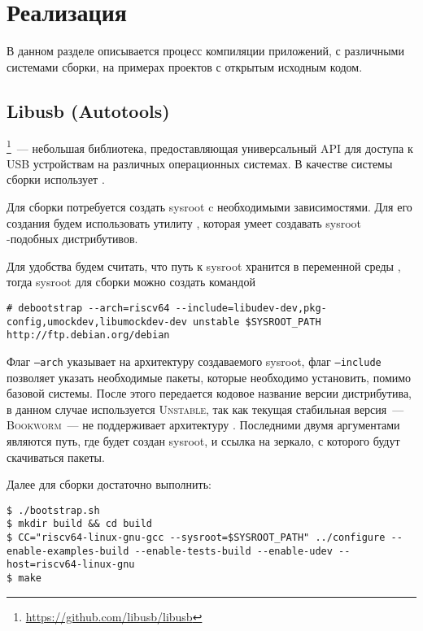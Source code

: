 
\section{Реализация}

В данном разделе описывается процесс компиляции приложений, с различными системами сборки, на примерах проектов с открытым исходным кодом.


\subsection{Libusb (Autotools)}

\libusb{}\footnote{\url{https://github.com/libusb/libusb}}~--- небольшая библиотека, предоставляющая универсальный API для доступа к USB устройствам на различных операционных системах.
В качестве системы сборки использует \autotools{}.

Для сборки потребуется создать sysroot c необходимыми зависимостями.
Для его создания будем использовать утилиту \debootstrap{}, которая умеет создавать sysroot \debian{}-подобных дистрибутивов.

Для удобства будем считать, что путь к sysroot хранится в переменной среды \sysrootPath{}, тогда sysroot для сборки \libusb{} можно создать командой
\begin{verbatim}
# debootstrap --arch=riscv64 --include=libudev-dev,pkg-config,umockdev,libumockdev-dev unstable $SYSROOT_PATH http://ftp.debian.org/debian
\end{verbatim}
Флаг \texttt{--arch} указывает на архитектуру создаваемого sysroot, флаг \texttt{--include} позволяет указать необходимые пакеты, которые необходимо установить, помимо базовой системы.
После этого передается кодовое название версии дистрибутива, в данном случае используется \debian{} \textsc{Unstable}, так как текущая стабильная версия~--- \textsc{Bookworm}~--- не поддерживает архитектуру \riscv{}.
Последними двумя аргументами являются путь, где будет создан sysroot, и ссылка на зеркало, с которого будут скачиваться пакеты.

Далее для сборки достаточно выполнить:
\begin{verbatim}
$ ./bootstrap.sh
$ mkdir build && cd build
$ CC="riscv64-linux-gnu-gcc --sysroot=$SYSROOT_PATH" ../configure --enable-examples-build --enable-tests-build --enable-udev --host=riscv64-linux-gnu
$ make
\end{verbatim}

